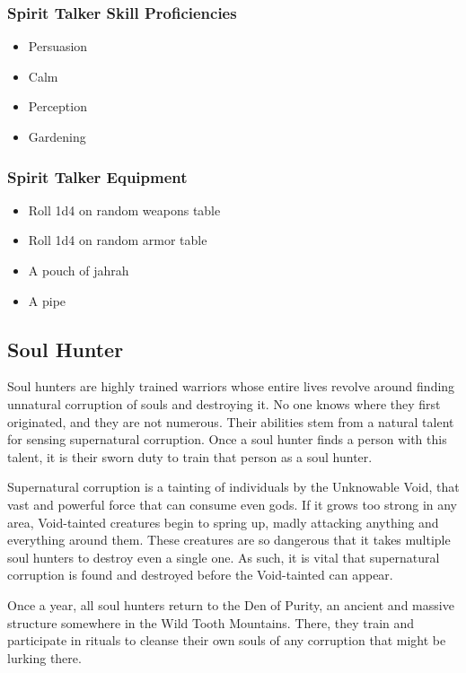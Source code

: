 \begin{multicols}{2}
\subsubsection{Spirit Talker Skill Proficiencies}

\begin{itemize}
  \item Persuasion
  \item Calm
  \item Perception
  \item Gardening
\end{itemize}

\subsubsection{Spirit Talker Equipment}

\begin{itemize}
  \item Roll 1d4 on random weapons table
  \item Roll 1d4 on random armor table
  \item A pouch of jahrah
  \item A pipe
\end{itemize}

\subsection{Soul Hunter}

Soul hunters are highly trained warriors whose entire lives revolve around
finding unnatural corruption of souls and destroying it. No one knows where
they first originated, and they are not numerous. Their abilities stem from
a natural talent for sensing supernatural corruption. Once a soul hunter 
finds a person with this talent, it is their sworn duty to train that person
as a soul hunter.

Supernatural corruption is a tainting of individuals by the Unknowable Void, 
that vast and powerful force that can consume even gods. If it grows too strong
in any area, Void-tainted creatures begin to spring up, madly attacking anything
and everything around them. These creatures are so dangerous that it takes
multiple soul hunters to destroy even a single one. As such, it is vital that
supernatural corruption is found and destroyed before the Void-tainted can appear.

Once a year, all soul hunters return to the Den of Purity, an ancient and massive
structure somewhere in the Wild Tooth Mountains. There, they train and
participate in rituals to cleanse their own souls of any corruption that might
be lurking there.


\end{multicols}
